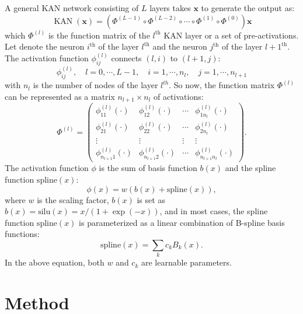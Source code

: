 \documentclass[11pt]{scrartcl}
\begin{document}
A general KAN network consisting of $L$ layers takes $\mathbf{x}$ to generate the output as:
\begin{equation}
	\label{eq:general-KAN}
	\operatorname{KAN}(\mathbf{x})=\left(\Phi^{(L-1)}\circ\Phi^{(L-2)}\circ\cdots\circ\Phi^{(1)}\circ\Phi^{(0)}\right)\mathbf{x}
\end{equation}
which $\Phi^{(l)}$ is the function matrix of the $l^{\text{th}}$ KAN layer or a set of pre-activations. Let denote the neuron $i^{\text{th}}$ of the layer $l^{\text{th}}$ and the neuron $j^{\text{th}}$ of the layer $l+1^{\text{th}}$. The activation function $\phi_{ij}^{(l)}$ connects $(l,i)$ to $(l+1, j)$:
\begin{equation*}
	\phi_{ij}^{(l)},\quad l=0, \cdots, L-1, \quad i=1, \cdots, n_l,\quad j=1, \cdots, n_{l+1}
\end{equation*}
with $n_l$ is the number of nodes of the layer $l^{t h}$. So now, the function matrix $\Phi^{(l)}$ can be represented as a matrix $n_{l+1}\times n_l$ of activations:
\begin{equation*}
	\Phi^{(l)}=\left(\begin{array}{cccc}
			\phi_{11}^{(l)}(\cdot)       & \phi_{12}^{(l)}(\cdot)       & \cdots & \phi_{1n_l}^{(l)}(\cdot)       \\
			\phi_{21}^{(l)}(\cdot)       & \phi_{22}^{(l)}(\cdot)       & \cdots & \phi_{2n_l}^{(l)}(\cdot)       \\
			\vdots                       & \vdots                       & \vdots & \vdots                         \\
			\phi_{n_{l+1}1}^{(l)}(\cdot) & \phi_{n_{l+1}2}^{(l)}(\cdot) & \cdots & \phi_{n_{l+1}n_l}^{(l)}(\cdot)
		\end{array}\right).
\end{equation*}
The activation function $\phi$ is the sum of basis function $b(x)$ and the spline function $\text{spline}(x)$:
\begin{equation}
	\phi(x)=w(b(x)+\text{spline}(x)),
\end{equation}
where $w$ is the scaling factor, $b(x)$ is set as $b(x)=\text{silu}(x)=x/(1+\exp(-x))$, and in most cases, the spline function $\text{spline}(x)$ is parameterized as a linear combination of B-spline basis functions:
\begin{equation*}
	\text{spline}(x)=\sum_{k}c_kB_k(x).
\end{equation*}
In the above equation, both $w$ and $c_k$ are learnable parameters.

\section{Method}
\end{document}
